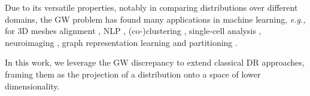Due to its versatile properties, notably in comparing distributions over different domains,  the GW problem has found many applications in machine learning, \textit{e.g.,} for 3D meshes alignment \citep{solomon2016entropic,ezuz2017gwcnn}, NLP \citep{alvarez2018gromov}, (co-)clustering  \citep{peyre2016gromov, redko2020co}, single-cell analysis \citep{demetci2020gromov}, neuroimaging \citep{thual2022aligning}, graph representation learning \citep{xu2020gromov, vincent2021online, liu2022robust, vincent2022template, pmlr-v202-zeng23c} and partitioning \citep{xu2019scalable, chowdhury2021generalized}.

In this work, we leverage the GW discrepancy to extend classical DR approaches, framing them as the projection of a distribution onto a space of lower dimensionality. 